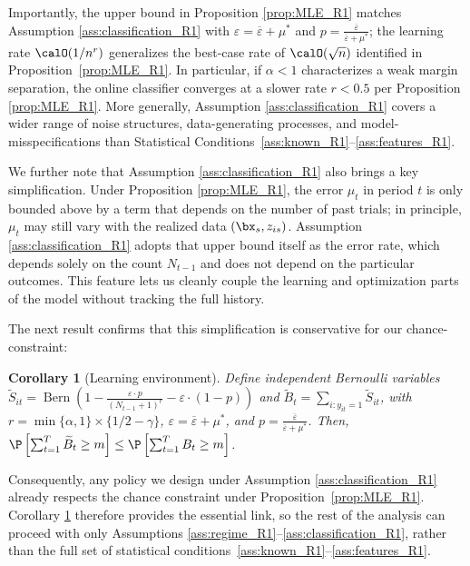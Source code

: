 \documentclass[11pt]{article}
\DeclareMathOperator{\Bern}{Bern}
\newtheorem{corollary}{Corollary}[]
\begin{document}
Importantly, the upper bound in Proposition \ref{prop:MLE_R1} matches Assumption \ref{ass:classification_R1} with $\varepsilon = \overline\varepsilon + \mu^*$ and $p=\frac{\overline\varepsilon}{\overline\varepsilon+\mu^*}$; the learning rate $\calO(1/n^r)$ generalizes the best-case rate of $\calO(\sqrt n)$ identified in Proposition~\ref{prop:MLE_R1}. In particular, if $\alpha<1$ characterizes a weak margin separation, the online classifier converges at a slower rate $r<0.5$ per Proposition \ref{prop:MLE_R1}. More generally, Assumption \ref{ass:classification_R1} covers a wider range of noise structures, data-generating processes, and model-misspecifications than Statistical Conditions~\ref{ass:known_R1}–\ref{ass:features_R1}.

We further note that Assumption \ref{ass:classification_R1} also brings a key simplification. Under Proposition \ref{prop:MLE_R1}, the error $\mu_t$ in period $t$ is only bounded above by a term that depends on the number of past trials; in principle, $\mu_t$ may still vary with the realized data $(\bx_s,z_{is})$. Assumption \ref{ass:classification_R1} adopts that upper bound itself as the error rate, which depends solely on the count $N_{t-1}$ and does not depend on the particular outcomes. This feature lets us cleanly couple the learning and optimization parts of the model without tracking the full history.

The next result confirms that this simplification is conservative for our chance-constraint:
\setcounter{corollary}{0}
\begin{corollary}[Learning environment] \label{cor:learning_R1}
    Define independent Bernoulli variables\\$\widetilde{S}_{it}=\Bern\left(1-\frac{\varepsilon\cdot p}{\left(N_{t-1} + 1\right)^r}-\varepsilon\cdot(1-p)\right)$ and $\widetilde{B}_t = \sum_{i:y_{it}=1} \widetilde{S}_{it}$, with $r=\min\{\alpha,1\} \times \{1/2-\gamma\}$, $\varepsilon = \overline\varepsilon + \mu^*$, and $p = \frac{\overline\varepsilon}{\overline\varepsilon+\mu^*}$. Then, $\P\left[\sum_{t=1}^T\widetilde{B}_t\geq m\right] \leq \P\left[\sum_{t=1}^TB_t\geq m\right]$.
\end{corollary}
Consequently, any policy we design under Assumption \ref{ass:classification_R1} already respects the chance constraint under Proposition~\ref{prop:MLE_R1}. Corollary \ref{cor:learning_R1} therefore provides the essential link, so the rest of the analysis can proceed with only Assumptions \ref{ass:regime_R1}--\ref{ass:classification_R1}, rather than the full set of statistical conditions~\ref{ass:known_R1}–\ref{ass:features_R1}.
\end{document}
